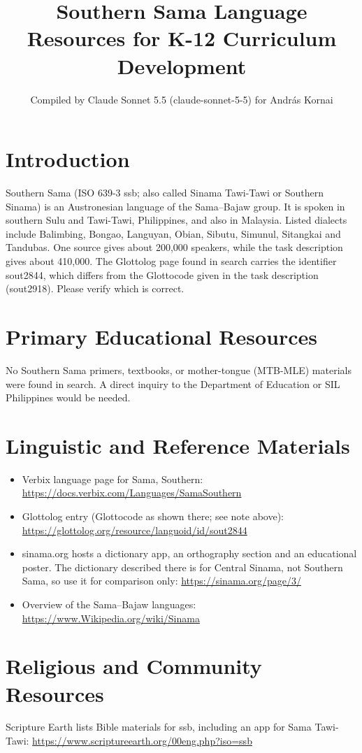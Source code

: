 \documentclass[12pt]{article}
\title{Southern Sama Language Resources for K-12 Curriculum Development}
\author{Compiled by Claude Sonnet 5.5 (claude-sonnet-5-5) for Andr\'as Kornai}
\date{}
\begin{document}
\maketitle

\section{Introduction}
Southern Sama (ISO 639-3 ssb; also called Sinama Tawi-Tawi or Southern Sinama) is an Austronesian language of the Sama--Bajaw group. It is spoken in southern Sulu and Tawi-Tawi, Philippines, and also in Malaysia. Listed dialects include Balimbing, Bongao, Languyan, Obian, Sibutu, Simunul, Sitangkai and Tandubas. One source gives about 200,000 speakers, while the task description gives about 410,000. The Glottolog page found in search carries the identifier sout2844, which differs from the Glottocode given in the task description (sout2918). Please verify which is correct.

\section{Primary Educational Resources}
No Southern Sama primers, textbooks, or mother-tongue (MTB-MLE) materials were found in search. A direct inquiry to the Department of Education or SIL Philippines would be needed.

\section{Linguistic and Reference Materials}
\begin{itemize}
\item Verbix language page for Sama, Southern: \url{https://docs.verbix.com/Languages/SamaSouthern}
\item Glottolog entry (Glottocode as shown there; see note above): \url{https://glottolog.org/resource/languoid/id/sout2844}
\item sinama.org hosts a dictionary app, an orthography section and an educational poster. The dictionary described there is for Central Sinama, not Southern Sama, so use it for comparison only: \url{https://sinama.org/page/3/}
\item Overview of the Sama--Bajaw languages: \url{https://www.Wikipedia.org/wiki/Sinama}
\end{itemize}

\section{Religious and Community Resources}
Scripture Earth lists Bible materials for ssb, including an app for Sama Tawi-Tawi: \url{https://www.scriptureearth.org/00eng.php?iso=ssb}
\end{document}
